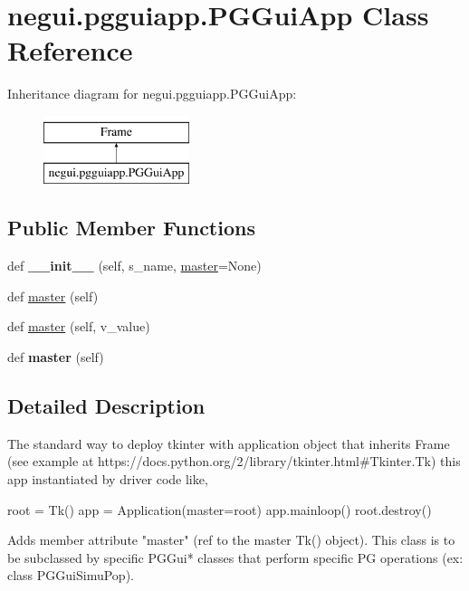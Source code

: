 \hypertarget{classnegui_1_1pgguiapp_1_1PGGuiApp}{}\section{negui.\+pgguiapp.\+P\+G\+Gui\+App Class Reference}
\label{classnegui_1_1pgguiapp_1_1PGGuiApp}
Inheritance diagram for negui.\+pgguiapp.\+P\+G\+Gui\+App\+:\begin{figure}[H]
\begin{center}
\leavevmode
\includegraphics[height=2.000000cm]{classnegui_1_1pgguiapp_1_1PGGuiApp}
\end{center}
\end{figure}
\subsection*{Public Member Functions}
\begin{DoxyCompactItemize}
\item 
def {\bfseries \+\_\+\+\_\+init\+\_\+\+\_\+} (self, s\+\_\+name, \hyperlink{classnegui_1_1pgguiapp_1_1PGGuiApp_a0af5ea1a1b6d1565002150d7b53efbdc}{master}=None)\hypertarget{classnegui_1_1pgguiapp_1_1PGGuiApp_a0490187d0d326fa3582bb5832fc3e79c}{}\label{classnegui_1_1pgguiapp_1_1PGGuiApp_a0490187d0d326fa3582bb5832fc3e79c}

\item 
def \hyperlink{classnegui_1_1pgguiapp_1_1PGGuiApp_a0af5ea1a1b6d1565002150d7b53efbdc}{master} (self)
\item 
def \hyperlink{classnegui_1_1pgguiapp_1_1PGGuiApp_a9721978e605adde6c1bbcc8e243705fc}{master} (self, v\+\_\+value)
\item 
def {\bfseries master} (self)\hypertarget{classnegui_1_1pgguiapp_1_1PGGuiApp_a0af5ea1a1b6d1565002150d7b53efbdc}{}\label{classnegui_1_1pgguiapp_1_1PGGuiApp_a0af5ea1a1b6d1565002150d7b53efbdc}

\end{DoxyCompactItemize}


\subsection{Detailed Description}
\begin{DoxyVerb}The standard way to deploy tkinter with application object that inherits Frame
(see example at https://docs.python.org/2/library/tkinter.html#Tkinter.Tk)
this app instantiated by driver code like, 

root = Tk()
app = Application(master=root)
app.mainloop()
root.destroy()

Adds member attribute "master" (ref to the master Tk() object).
This class is to be subclassed by specific PGGui* classes that
perform specific PG operations (ex: class PGGuiSimuPop).
\end{DoxyVerb}
 

